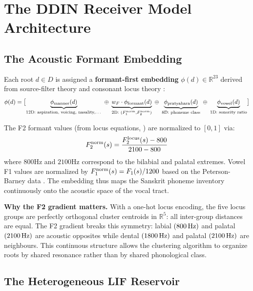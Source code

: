 \documentclass{article}
\begin{document}
\section{The DDIN Receiver Model Architecture}
\label{sec:architecture}

\subsection{The Acoustic Formant Embedding}

Each root $d \in D$ is assigned a \textbf{formant-first embedding} $\phi(d) \in \mathbb{R}^{23}$ derived from source-filter theory \cite{fant1960} and consonant locus theory \cite{sussman1991}:
\[
\phi(d) = \bigl[\underbrace{\phi_{\rm manner}(d)}_{\text{12D: aspiration, voicing, nasality,\ldots}}
\;\oplus\;
\underbrace{w_F \cdot \phi_{\rm formant}(d)}_{\text{2D: }(F_1^{\rm norm}, F_2^{\rm norm})}
\;\oplus\;
\underbrace{\phi_{\rm pratyahara}(d)}_{\text{8D: phoneme class}}
\;\oplus\;
\underbrace{\phi_{\rm vowel}(d)}_{\text{1D: sonority ratio}}\bigr]
\]

The F2 formant values (from locus equations, \cite{sussman1991}) are normalized to $[0,1]$ via:
\[
F_2^{\rm norm}(s) = \frac{F_2^{\rm locus}(s) - 800}{2100 - 800}
\]
where $800$Hz and $2100$Hz correspond to the bilabial and palatal extremes. Vowel F1 values are normalized by $F_1^{\rm norm}(s) = F_1(s)/1200$ based on the Peterson-Barney data \cite{peterson1952}. The embedding thus maps the Sanskrit phoneme inventory continuously onto the acoustic space of the vocal tract.

\textbf{Why the F2 gradient matters.} With a one-hot locus encoding, the five locus groups are perfectly orthogonal cluster centroids in $\mathbb{R}^5$: all inter-group distances are equal. The F2 gradient breaks this symmetry: labial $(800\,{\rm Hz})$ and palatal $(2100\,{\rm Hz})$ are acoustic opposites while dental $(1800\,{\rm Hz})$ and palatal $(2100\,{\rm Hz})$ are neighbours. This continuous structure allows the clustering algorithm to organize roots by shared resonance rather than by shared phonological class.

\subsection{The Heterogeneous LIF Reservoir}
\end{document}
